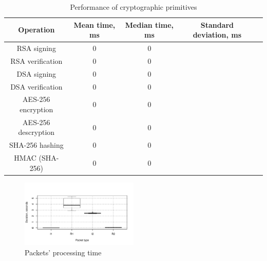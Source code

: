 \begin{table}
\centering
\begin{tabular}{|c|c|c|c|c|}
\hline
\bf{Operation} & \bf{Mean time, ms} & \bf{Median time, ms} & \bf{Standard deviation, ms}\\\hline\hline
RSA signing			&    0                        & 0               &                   \\
RSA verification	&    0                        & 0               &                   \\
DSA signing			&    0                        & 0               &                   \\
DSA verification	&    0                        & 0               &                   \\
AES-256 encryption  &    0                        & 0               &                   \\
AES-256 descryption &	 0 						  & 0               &                   \\
SHA-256 hashing     &    0                        & 0               &                   \\
HMAC (SHA-256)      &    0                        & 0               &                   \\
\hline
\end{tabular}
\caption{Performance of cryptographic primitives}
\label{tab:micro}
\end{table}

\begin{figure}
	\includegraphics[width=0.5\textwidth]{graphics/packet_processing.pdf}
	\caption{Packets' processing time}
	\label{fig:packet_processing}
\end{figure}

